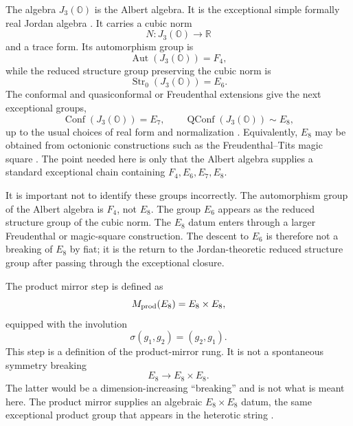 \documentclass[aps,prd,preprint,longbibliography,nofootinbib,superscriptaddress,floatfix]{revtex4-2}
\newcommand{\Aut}{\operatorname{Aut}}
\newcommand{\Str}{\operatorname{Str}}
\newcommand{\Conf}{\operatorname{Conf}}
\newcommand{\QConf}{\operatorname{QConf}}
\begin{document}
The algebra \(J_3(\mathbb O)\) is the Albert algebra. It is the exceptional
simple formally real Jordan algebra \cite{JordanVonNeumannWigner,
SpringerVeldkamp,BaezOctonions}. It carries a cubic norm
\begin{equation}
    N:J_3(\mathbb O)\longrightarrow \mathbb R
    \label{eq:mj_cubic_norm}
\end{equation}
and a trace form. Its automorphism group is
\begin{equation}
    \Aut(J_3(\mathbb O))=F_4,
    \label{eq:mj_f4_aut}
\end{equation}
while the reduced structure group preserving the cubic norm is
\begin{equation}
    \Str_0(J_3(\mathbb O))=E_6.
    \label{eq:mj_e6_structure}
\end{equation}
The conformal and quasiconformal or Freudenthal extensions give the next
exceptional groups,
\begin{equation}
    \Conf(J_3(\mathbb O))=E_7,
    \qquad
    \QConf(J_3(\mathbb O))\sim E_8,
    \label{eq:mj_e7_e8}
\end{equation}
up to the usual choices of real form and normalization
\cite{Freudenthal,SpringerVeldkamp,BaezOctonions}. Equivalently, \(E_8\) may be
obtained from octonionic constructions such as the Freudenthal--Tits magic
square \cite{TitsMagicSquare,AdamsLectures,BartonSudbery}. The point needed
here is only that the Albert algebra supplies a standard exceptional chain
containing \(F_4,E_6,E_7,E_8\).

It is important not to identify these groups incorrectly. The automorphism group
of the Albert algebra is \(F_4\), not \(E_8\). The group \(E_6\) appears as the
reduced structure group of the cubic norm. The \(E_8\) datum enters through a
larger Freudenthal or magic-square construction. The descent to \(E_6\) is
therefore not a breaking of \(E_8\) by fiat; it is the return to the
Jordan-theoretic reduced structure group after passing through the exceptional
closure.

The product mirror step is defined as
\begin{equation}
    M_{\rm prod}(E_8)
    =
    E_8\times E_8,
    \label{eq:mj_product_mirror}
\end{equation}
equipped with the involution
\begin{equation}
    \sigma(g_1,g_2)=(g_2,g_1).
    \label{eq:mj_product_involution}
\end{equation}
This step is a definition of the product-mirror rung. It is not a spontaneous
symmetry breaking
\[
    E_8\longrightarrow E_8\times E_8 .
\]
The latter would be a dimension-increasing ``breaking'' and is not what is
meant here. The product mirror supplies an algebraic \(E_8\times E_8\) datum,
the same exceptional product group that appears in the heterotic string
\cite{GrossHarveyMartinecRohm1,GrossHarveyMartinecRohm2}.
\end{document}
